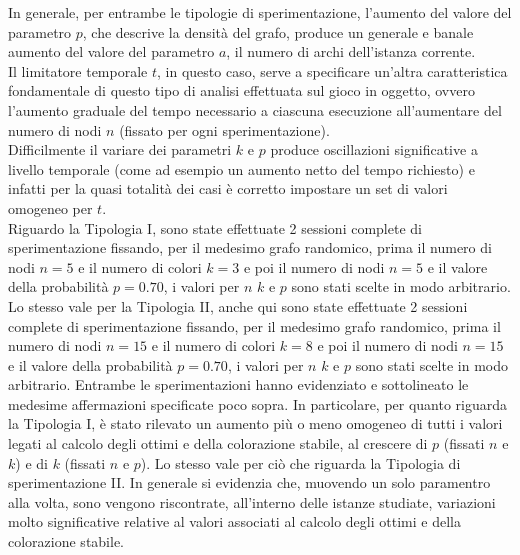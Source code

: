 In generale, per entrambe le tipologie di sperimentazione, l'aumento del valore del parametro $p$, che descrive la densità del grafo, produce un generale e banale aumento del valore del parametro $a$, il numero di archi dell'istanza corrente.\\

Il limitatore temporale $t$, in questo caso, serve a specificare un'altra caratteristica fondamentale di questo tipo di analisi effettuata sul gioco in oggetto, ovvero l'aumento graduale del tempo necessario a ciascuna esecuzione all'aumentare del numero di nodi $n$ (fissato per ogni sperimentazione).\\
Difficilmente il variare dei parametri $k$ e $p$ produce oscillazioni significative a livello temporale (come ad esempio un aumento netto del tempo richiesto) e infatti per la quasi totalità dei casi è corretto impostare un set di valori omogeneo per $t$.\\

Riguardo la Tipologia I, sono state effettuate 2 sessioni complete di sperimentazione fissando, per il medesimo grafo randomico, prima il numero di nodi $n=5$ e il numero di colori $k=3$ e poi il numero di nodi $n=5$ e il valore della probabilità $p=0.70$, i valori per $n$ $k$ e $p$ sono stati scelte in modo arbitrario.
Lo stesso vale per la Tipologia II, anche qui sono state effettuate 2 sessioni complete di sperimentazione fissando, per il medesimo grafo randomico, prima il numero di nodi $n=15$ e il numero di colori $k=8$ e poi il numero di nodi $n=15$ e il valore della probabilità $p=0.70$, i valori per $n$ $k$ e $p$ sono stati scelte in modo arbitrario.
Entrambe le sperimentazioni hanno evidenziato e sottolineato le medesime affermazioni specificate poco sopra. In particolare, per quanto riguarda la Tipologia I, è stato rilevato un aumento più o meno omogeneo di tutti i valori legati al calcolo degli ottimi e della colorazione stabile, al crescere di $p$ (fissati $n$ e $k$) e di $k$ (fissati $n$ e $p$). Lo stesso vale per ciò che riguarda la Tipologia di sperimentazione II. In generale si evidenzia che, muovendo un solo paramentro alla volta, sono vengono riscontrate, all'interno delle istanze studiate, variazioni molto significative relative al valori associati al calcolo degli ottimi e della colorazione stabile.

